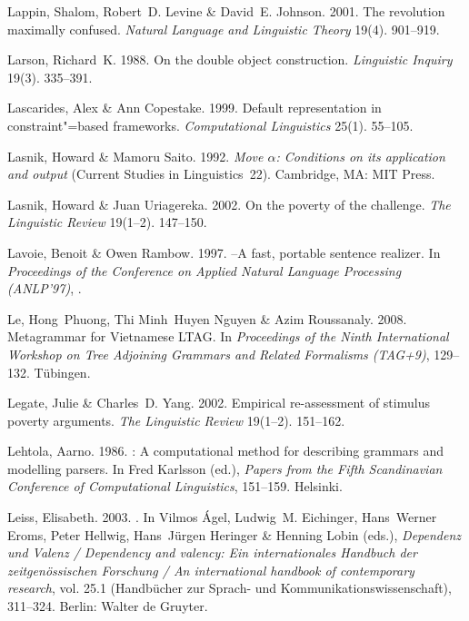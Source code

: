\begin{thebibliography}{1420}
Lappin, Shalom, Robert~D. Levine \& David~E. Johnson. 2001.
\newblock The revolution maximally confused.
\newblock \emph{Natural Language and Linguistic Theory} 19(4). 901--919.

Larson, Richard~K. 1988.
\newblock On the double object construction.
\newblock \emph{Linguistic Inquiry} 19(3). 335--391.

Lascarides, Alex \& Ann Copestake. 1999.
\newblock Default representation in constraint"=based frameworks.
\newblock \emph{Computational Linguistics} 25(1). 55--105.

Lasnik, Howard \& Mamoru Saito. 1992.
\newblock \emph{Move $\alpha$: Conditions on its application and output}
  (Current Studies in Linguistics~22).
\newblock Cambridge, MA: MIT Press.

Lasnik, Howard \& Juan Uriagereka. 2002.
\newblock On the poverty of the challenge.
\newblock \emph{The Linguistic Review} 19(1--2). 147--150.

Lavoie, Benoit \& Owen Rambow. 1997.
--{A} fast, portable sentence realizer.
\newblock In \emph{Proceedings of the {Conference on Applied Natural Language
  Processing (ANLP'97)}}, .

Le, Hong~Phuong, Thi Minh~Huyen Nguyen \& Azim Roussanaly. 2008.
\newblock Metagrammar for {Vietnamese} {LTAG}.
\newblock In \emph{Proceedings of the {Ninth International Workshop on Tree
  Adjoining Grammars and Related Formalisms (TAG+9)}}, 129--132. T{\"u}bingen.

Legate, Julie \& Charles~D. Yang. 2002.
\newblock Empirical re-assessment of stimulus poverty arguments.
\newblock \emph{The Linguistic Review} 19(1--2). 151--162.

Lehtola, Aarno. 1986.
: {A} computational method for describing grammars and modelling
  parsers.
\newblock In Fred Karlsson (ed.), \emph{Papers from the {Fifth Scandinavian
  Conference of Computational Linguistics}}, 151--159. Helsinki.

Leiss, Elisabeth. 2003.
.
\newblock In Vilmos {\'A}gel, Ludwig~M. Eichinger, Hans~Werner Eroms, Peter
  Hellwig, Hans~J{\"u}rgen Heringer \& Henning Lobin (eds.), \emph{{Dependenz
  und Valenz} / {Dependency} and valency: {Ein internationales Handbuch der
  zeitgen{\"o}ssischen Forschung} / {An} international handbook of contemporary
  research}, vol. 25.1  (Hand\-b{\"u}\-cher zur Sprach- und
  Kommunikationswissenschaft), 311--324. Berlin: Walter de Gruyter.


\end{thebibliography}
